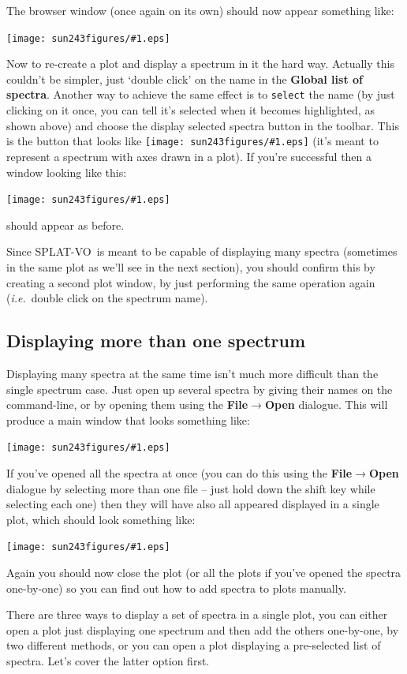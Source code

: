 \documentclass[twoside,11pt]{article}
\newcommand{\htmladdimg}[1]{}
\newcommand{\latexhtml}[2]{#1}
\newcommand{\xlabel}[1]{}
\renewcommand{\_}{\texttt{\symbol{95}}}
\newcommand{\SPLAT}{\textsf{SPLAT-VO}}
\newcommand{\mainfigure}[1]
{\begin{center}
 \latexhtml{\texttt{[image: sun243\_figures/\#1.eps]}}{\htmladdimg{#1.gif}}
 \end{center}
}
\newcommand{\inline}[1]
        {\latexhtml{\texttt{[image: sun243\_figures/\#1.eps]}}
        {\htmladdimg[align=center]{#1.gif}}}
\newcommand{\submenuitem}[2]{\latexhtml{\textbf{#1$\rightarrow$#2}}{\textbf{#1->#2}}}
\newcommand{\labelitem}[1]{\textbf{#1}}
\newcommand{\hitext}[1]{\texttt{#1}}
\newcommand{\ie}{\textit{i.e.}}
\begin{document}
The browser window (once again on its own) should now appear something
like:

\mainfigure{browser2}

Now to re-create a plot and display a spectrum in it the hard
way. Actually this couldn't be simpler, just `double click' on the
name in the \labelitem{Global list of spectra}. Another way to achieve
the same effect is to \hitext{select} the name (by just clicking on it
once, you can tell it's selected when it becomes highlighted, as shown
above) and choose the display selected spectra button in the
toolbar. This is the button that looks like \inline{display} (it's
meant to represent a spectrum with axes drawn in a plot). If you're
successful then a window looking like this:

\mainfigure{plot1}

should appear as before.

Since \SPLAT\ is meant to be capable of displaying many spectra
(sometimes in the same plot as we'll see in the next section), you
should confirm this by creating a second plot window, by just
performing the same operation again (\ie\ double click on the
spectrum name).

\newpage
\subsection{Displaying more than one spectrum\xlabel{displaying_more_than_one_spectrum}}

Displaying many spectra at the same time isn't much more difficult
than the single spectrum case. Just open up several spectra by giving
their names on the command-line, or by opening them using the
\submenuitem{File}{Open} dialogue. This will produce a main window that
looks something like:

\mainfigure{browser3}

If you've opened all the spectra at once (you can do this using the
\submenuitem{File}{Open} dialogue by selecting more than one file --
just hold down the shift key while selecting each one) then they will
have also all appeared displayed in a single plot, which should look
something like:

\mainfigure{plot2}

Again you should now close the plot (or all the plots if you've opened
the spectra one-by-one) so you can find out how to add spectra to
plots manually.

There are three ways to display a set of spectra in a single plot, you
can either open a plot just displaying one spectrum and then add the
others one-by-one, by two different methods, or you can open a plot
displaying a pre-selected list of spectra. Let's cover the latter
option first.
\end{document}
